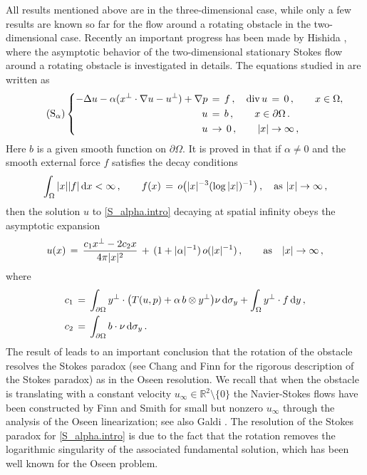 \documentclass[11pt,a4paper]{article}
\newcommand{\R}{\mathbb{R}}
\newcommand{\dd}{\,{\rm d}}
\begin{document}
All results mentioned above are in the three-dimensional case, 
while only a few results are known so far for the flow around a rotating obstacle in the two-dimensional case. 
Recently an important progress has been made by Hishida \cite{H3}, 
where the asymptotic behavior of the two-dimensional stationary Stokes flow around a rotating obstacle is investigated in details.
The equations studied in \cite{H3} are written as 
%
\begin{equation}\tag{S$_{\alpha}$}\label{S_alpha.intro}
  \left\{
\begin{aligned}
  -\Delta u - \alpha ( x^\bot \cdot \nabla u - u^\bot ) + \nabla p & \,=\, f \,,  
  \quad {\rm div}\, u \,=\, 0\,, ~~~~~~ x \in \Omega, \\
  u & \,=\, b \,, ~~~~~~ x \in \partial \Omega\,. \\
  u & \, \rightarrow \,     0   \,,  ~~~~~~ |x| \rightarrow \infty\,,
\end{aligned}\right.
\end{equation}
%
Here $b$ is a given smooth function on $\partial\Omega$. It is proved in \cite{H3} that if $\alpha \ne 0$ and the smooth external force  $f$ satisfies the decay conditions
%
\begin{align}\label{condition.f}
\int_\Omega |x| |f| \dd x <\infty\,, \qquad f(x) \, = \, o \big (|x|^{-3} (\log |x|)^{-1} \big )\,, \quad {\rm as} ~|x|\rightarrow \infty\,,
\end{align}
%
then the solution $u$ to \eqref{S_alpha.intro} decaying at spatial infinity obeys the asymptotic expansion
%
\begin{align}\label{asymptotic.h.1}
u(x) \, = \, \frac{c_1 x^\bot - 2 c_2 x}{4\pi |x|^2} \, + \, (1+ |\alpha|^{-1}) \, o (|x|^{-1})\,, \qquad {\rm as} \quad  |x|\rightarrow \infty\,,
\end{align}
%
where 
%
\begin{align}\label{asymptotic.h.2}
\begin{split}
c_1 & \, = \, \int_{\partial\Omega} y^\bot \cdot \big ( T (u,p)  + \alpha \,  b \otimes y^\bot  \big ) \nu \dd \sigma_y  + \int_\Omega y^\bot \cdot f \dd y\,,\\
c_2 & \, = \, \int_{\partial\Omega} b \cdot \nu \dd \sigma_y\,. 
\end{split}
\end{align}
%
The result of \cite{H3} leads to an important conclusion that the rotation of the obstacle resolves the Stokes paradox (see Chang and Finn \cite{CF} for the rigorous description of the Stokes paradox) 
as in the Oseen resolution. 
We recall that when the obstacle is translating with a constant velocity $u_\infty\in \R^2\setminus \{0\}$ the Navier-Stokes flows have been constructed by Finn and Smith \cite{FS1,FS2} for small but nonzero $u_\infty$ through the analysis of the Oseen linearization; see also Galdi \cite{G3}. 
The resolution of the Stokes paradox for \eqref{S_alpha.intro} is due to the fact that the rotation removes the logarithmic singularity of the associated fundamental solution, which has been well known for the Oseen problem.
\end{document}
